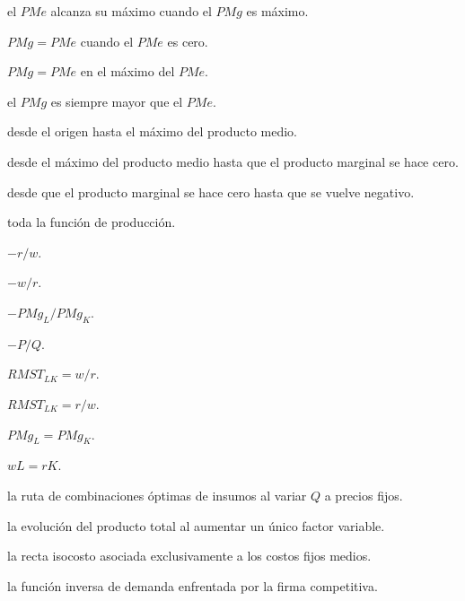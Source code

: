 \begin{opts}
    \item el $PMe$ alcanza su máximo cuando el $PMg$ es máximo.
    \item $PMg=PMe$ cuando el $PMe$ es cero.
    \item $PMg=PMe$ en el máximo del $PMe$.
    \item el $PMg$ es siempre mayor que el $PMe$.
\end{opts}

\begin{opts}
    \item desde el origen hasta el máximo del producto medio.
    \item desde el máximo del producto medio hasta que el producto marginal se hace cero.
    \item desde que el producto marginal se hace cero hasta que se vuelve negativo.
    \item toda la función de producción.
\end{opts}

\begin{opts}
    \item $-r/w$.
    \item $-w/r$.
    \item $-PMg_L/PMg_K$.
    \item $-P/Q$.
\end{opts}

\begin{opts}
    \item $RMST_{LK}=w/r$.
    \item $RMST_{LK}=r/w$.
    \item $PMg_L=PMg_K$.
    \item $wL=rK$.
\end{opts}

\begin{opts}
    \item la ruta de combinaciones óptimas de insumos al variar $Q$ a precios fijos.
    \item la evolución del producto total al aumentar un único factor variable.
    \item la recta isocosto asociada exclusivamente a los costos fijos medios.
    \item la función inversa de demanda enfrentada por la firma competitiva.
\end{opts}

